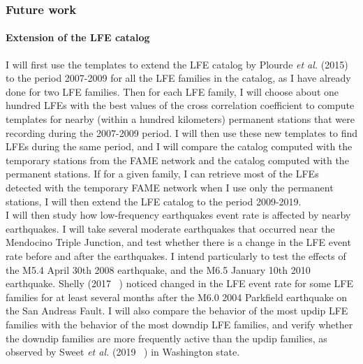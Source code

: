 \documentclass[letterpaper, 12pt]{article}
\begin{document}
\subsubsection*{Future work}

\paragraph{Extension of the LFE catalog} I will first use the templates to extend the LFE catalog by Plourde \textit{et al.} (2015) to the period 2007-2009 for all the LFE families in the catalog, as I have already done for two LFE families. Then for each LFE family, I will choose about one hundred LFEs with the best values of the cross correlation coefficient to compute templates for nearby (within a hundred kilometers) permanent stations that were recording during the 2007-2009 period. I will then use these new templates to find LFEs during the same period, and I will compare the catalog computed with the temporary stations from the FAME network and the catalog computed with the permanent stations. If for a given family, I can retrieve most of the LFEs detected with the temporary FAME network when I use only the permanent stations, I will then extend the LFE catalog to the period 2009-2019. \\

I will then study how low-frequency earthquakes event rate is affected by nearby earthquakes. I will take several moderate earthquakes that occurred near the Mendocino Triple Junction, and test whether there is a change in the LFE event rate before and after the earthquakes. I intend particularly to test the effects of the M5.4 April 30th 2008 earthquake, and the M6.5 January 10th 2010 earthquake. Shelly (2017 ~\cite{SHE_2017}) noticed changed in the LFE event rate for some LFE families for at least several months after the M6.0 2004 Parkfield earthquake on the San Andreas Fault. I will also compare the behavior of the most updip LFE families with the behavior of the most downdip LFE families, and verify whether the downdip families are more frequently active than the updip families, as observed by Sweet \textit{et al.} (2019 ~\cite{SWE_2019}) in Washington state.
\end{document}
